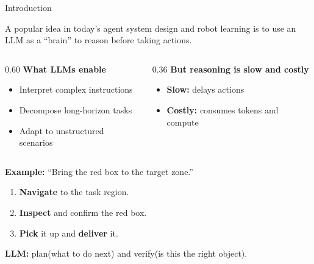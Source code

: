 \documentclass[aspectratio=169]{beamer}
\begin{document}
\begin{frame}{Introduction}
    \vspace{0.35cm}
    
    A popular idea in today's agent system design and robot learning is to use an LLM as a ``brain'' to reason before taking actions.
    
    \vspace{0.35cm}

    \begin{columns}[T,onlytextwidth]

        \begin{column}{0.60\textwidth}
            \textbf{What LLMs enable}
            \begin{itemize}
                \setlength{\itemsep}{0.15em}
                \item Interpret complex instructions
                \item Decompose long-horizon tasks
                \item Adapt to unstructured scenarios
            \end{itemize}
        \end{column}

        \begin{column}{0.36\textwidth}
            {\color{red!75!black}\textbf{But reasoning is slow and costly}}
            \begin{itemize}
                \setlength{\itemsep}{0.15em}
                \item \textbf{Slow:} delays actions
                \item \textbf{Costly:} consumes tokens
                      and compute
            \end{itemize}
        \end{column}

    \end{columns}

    \vspace{0.35cm}

    \textbf{Example:}
    ``Bring the red box to the target zone.''

    \begin{enumerate}
        \setlength{\itemsep}{0.1em}
        \item \textbf{Navigate} to the task region.
        \item \textbf{Inspect} and confirm the red box.
        \item \textbf{Pick} it up and \textbf{deliver} it.
    \end{enumerate}

    \vspace{0.15cm}

    \textbf{LLM:} plan(what to do next) and verify(is this the right object).
    \quad

    \vspace{0.45cm}


\end{frame}
\end{document}
